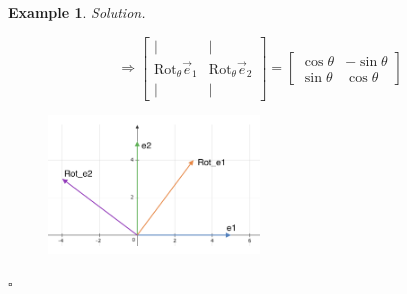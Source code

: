 \documentclass[12pt, a4paper]{article}
\newtheorem{eg}{Example}[subsection]
\newenvironment*{sol}{\indent\textit{Solution. }}{\hfill{$\square$}\par}
\def\vece{\vec{e}}
\begin{document}
\begin{eg}
\begin{sol}
\begin{enumerate}
$$\Longrightarrow\begin{bmatrix}|&|\\ \text{Rot}_{\theta}\vece_1& \text{Rot}_{\theta}\vece_2\\|&|\end{bmatrix}=\begin{bmatrix}\cos{\theta}&-\sin{\theta}\\\sin{\theta}&\cos{\theta}\end{bmatrix}$$
\begin{figure}[H] 
\centering 
\includegraphics[width=0.5\textwidth]{Rotation.png}
\end{figure}
\end{enumerate}
\end{sol}
\end{eg}
\end{document}
